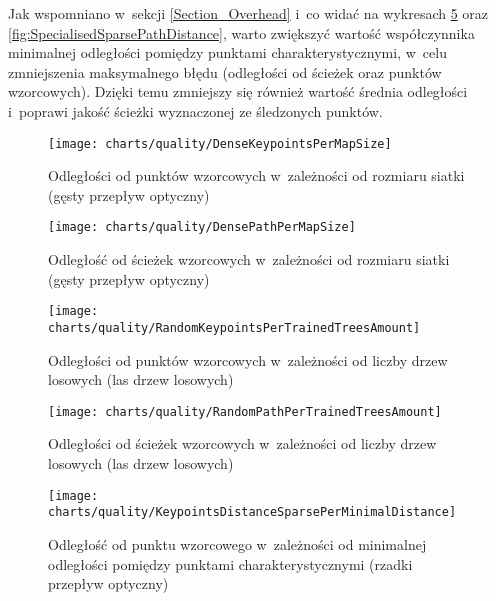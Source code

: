     Jak wspomniano w~sekcji \ref{Section_Overhead} i~co widać na wykresach \ref{fig:SpecialisedSparseKeypointsDistance} oraz \ref{fig:SpecialisedSparsePathDistance}, warto zwiększyć wartość współczynnika minimalnej odległości pomiędzy punktami charakterystycznymi, w~celu zmniejszenia maksymalnego błędu (odległości od ścieżek oraz punktów wzorcowych). Dzięki temu zmniejszy się również wartość średnia odległości i~poprawi jakość ścieżki wyznaczonej ze śledzonych punktów.

    \newpage
      \begin{figure}[!ht]
        \centering
        \texttt{[image: charts/quality/DenseKeypointsPerMapSize]}
        \caption[Odległości od punktów wzorcowych w~zależności od rozmiaru siatki]
                {Odległości od punktów wzorcowych w~zależności od rozmiaru siatki (gęsty przepływ optyczny)}
        \label{fig:DenseKeypointsPerMapSize}
      \end{figure}

      \begin{figure}[!ht]
        \centering
        \texttt{[image: charts/quality/DensePathPerMapSize]}
        \caption[Odległość od ścieżek wzorcowych w~zależności od rozmiaru siatki]
                {Odległość od ścieżek wzorcowych w~zależności od rozmiaru siatki (gęsty przepływ optyczny)}
        \label{fig:DensePathPerMapSize}
      \end{figure}

    \newpage
      \begin{figure}[!ht]
        \centering
        \texttt{[image: charts/quality/RandomKeypointsPerTrainedTreesAmount]}
        \caption[Odległości od punktów wzorcowych w~zależności od liczby drzew losowych]
                {Odległości od punktów wzorcowych w~zależności od liczby drzew losowych (las drzew losowych)}
        \label{fig:RandomKeypointsPerTrainedTreesAmount}
      \end{figure}

      \begin{figure}[!ht]
        \centering
        \texttt{[image: charts/quality/RandomPathPerTrainedTreesAmount]}
        \caption[Odległości od ścieżek wzorcowych w~zależności od liczby drzew losowych]
                {Odległości od ścieżek wzorcowych w~zależności od liczby drzew losowych (las drzew losowych)}
        \label{fig:RandomPathPerTrainedTreesAmount}
      \end{figure}

    \newpage
      \begin{figure}[!ht]
        \centering
        \texttt{[image: charts/quality/KeypointsDistanceSparsePerMinimalDistance]}
        \caption[Odległość od punktu wzorcowego w~zależności od minimalnej odległości pomiędzy punktami
                 charakterystycznymi]
                {Odległość od punktu wzorcowego w~zależności od minimalnej odległości pomiędzy punktami
                 charakterystycznymi (rzadki przepływ optyczny)}
        \label{fig:SpecialisedSparseKeypointsDistance}
      \end{figure}


